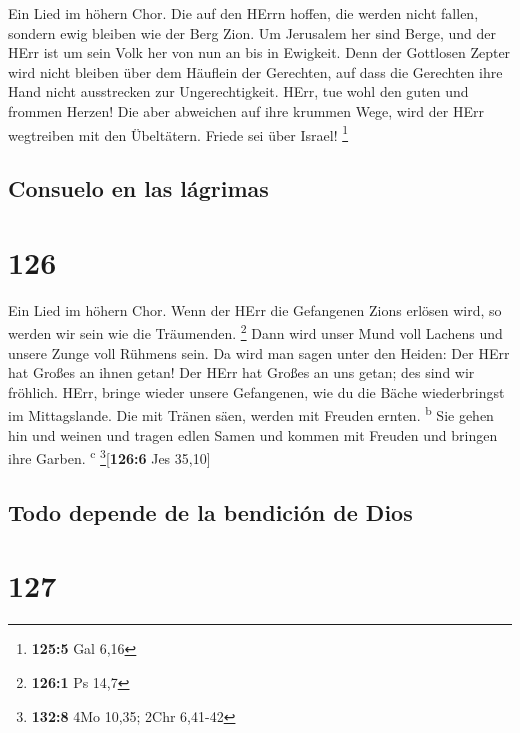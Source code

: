  Ein Lied im höhern Chor. Die auf den HErrn hoffen, die
werden nicht fallen, sondern ewig bleiben wie der Berg Zion.
 Um Jerusalem her sind Berge, und der HErr ist um sein
Volk her von nun an bis in Ewigkeit.  Denn der Gottlosen
Zepter wird nicht bleiben über dem Häuflein der Gerechten, auf dass die
Gerechten ihre Hand nicht ausstrecken zur Ungerechtigkeit.
 HErr, tue wohl den guten und frommen Herzen!
 Die aber abweichen auf ihre krummen Wege, wird der HErr
wegtreiben mit den Übeltätern. Friede sei über Israel! \footnote{\textbf{125:5}
  Gal 6,16}

\hypertarget{consuelo-en-las-luxe1grimas}{%
\subsection{Consuelo en las
lágrimas}\label{consuelo-en-las-luxe1grimas}}

\hypertarget{section-125}{%
\section{126}\label{section-125}}

 Ein Lied im höhern Chor. Wenn der HErr die Gefangenen
Zions erlösen wird, so werden wir sein wie die Träumenden. \footnote{\textbf{126:1}
  Ps 14,7}  Dann wird unser Mund voll Lachens und unsere
Zunge voll Rühmens sein. Da wird man sagen unter den Heiden: Der HErr
hat Großes an ihnen getan!  Der HErr hat Großes an uns
getan; des sind wir fröhlich.  HErr, bringe wieder unsere
Gefangenen, wie du die Bäche wiederbringst im Mittagslande.
 Die mit Tränen säen, werden mit Freuden ernten.
\textsuperscript{b}  Sie gehen hin und weinen und tragen
edlen Samen und kommen mit Freuden und bringen ihre Garben.
\textsuperscript{c} \footnote{\textbf{132:8} 4Mo 10,35; 2Chr 6,41-42}{[}\textbf{126:6}
Jes 35,10{]}

\hypertarget{todo-depende-de-la-bendiciuxf3n-de-dios}{%
\subsection{Todo depende de la bendición de
Dios}\label{todo-depende-de-la-bendiciuxf3n-de-dios}}

\hypertarget{section-126}{%
\section{127}\label{section-126}}

